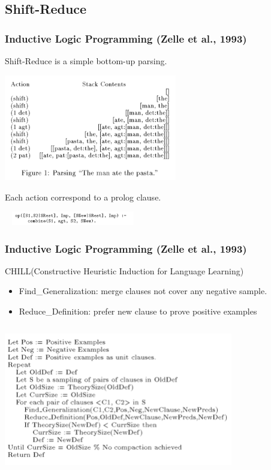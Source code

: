 \documentclass{beamer}
\begin{document}
\subsection{Shift-Reduce}

\begin{frame}
    \frametitle{Inductive Logic Programming (Zelle et al., 1993)}

    Shift-Reduce is a simple bottom-up parsing. 

    \begin{center}
        \includegraphics[height=4.62cm,width=7.55cm]{img/shift-reduce.png}
    \end{center}

    Each action correspond to a prolog clause.
    \begin{center}
        \includegraphics[height=0.6cm,width=6cm]{img/prolog-clause.png}
    \end{center}
\end{frame}

\begin{frame}
    \frametitle{Inductive Logic Programming (Zelle et al., 1993)}

    CHILL(Constructive Heuristic Induction for Language Learning)

    \begin{itemize}
        \item Find\_Generalization: merge clauses not cover any negative sample.
        \item Reduce\_Definition: prefer new clause to prove positive examples
    \end{itemize}

    \begin{center}
        \includegraphics[height=6.5cm,width=10cm]{img/inductive-logic.png}
    \end{center}
\end{frame}
\end{document}
